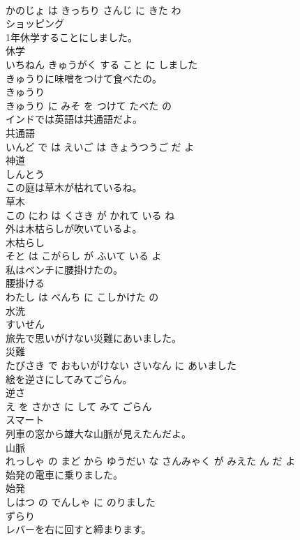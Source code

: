 \documentclass[8pt]{extreport}
\begin{document}
\begin{CJK}{UTF8}{min}
\\	かのじょ は きっちり さんじ に きた わ			
\\	ショッピング	
\\	1年休学することにしました。	
\\	休学 
\\	いちねん きゅうがく する こと に しました			
\\	きゅうりに味噌をつけて食べたの。	
\\	きゅうり 
\\	きゅうり に みそ を つけて たべた の			
\\	インドでは英語は共通語だよ。	
\\	共通語 
\\	いんど で は えいご は きょうつうご だ よ			
\\	神道	
\\	しんとう		
\\	この庭は草木が枯れているね。	
\\	草木 
\\	この にわ は くさき が かれて いる ね			
\\	外は木枯らしが吹いているよ。	
\\	木枯らし 
\\	そと は こがらし が ふいて いる よ			
\\	私はベンチに腰掛けたの。	
\\	腰掛ける 
\\	わたし は べんち に こしかけた の			
\\	水洗	
\\	すいせん		
\\	旅先で思いがけない災難にあいました。	
\\	災難 
\\	たびさき で おもいがけない さいなん に あいました			
\\	絵を逆さにしてみてごらん。	
\\	逆さ 
\\	え を さかさ に して みて ごらん			
\\	スマート	
\\	列車の窓から雄大な山脈が見えたんだよ。	
\\	山脈 
\\	れっしゃ の まど から ゆうだい な さんみゃく が みえた ん だ よ			
\\	始発の電車に乗りました。	
\\	始発 
\\	しはつ の でんしゃ に のりました			
\\	ずらり	
\\	レバーを右に回すと締まります。	

\end{CJK}
\end{document}
